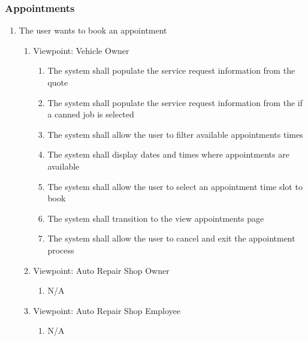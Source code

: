 \documentclass[12pt]{article}
\begin{document}
\subsubsection{Appointments}
\begin{enumerate}[resume*=business_events]
	\item The user wants to book an appointment
	      \begin{enumerate}[VP\arabic*.]
		      \item Viewpoint: Vehicle Owner
		            \begin{enumerate}
			            \item The system shall populate the service request information from the quote
			            \item The system shall populate the service request information from the if a canned job is selected
			            \item The system shall allow the user to filter available appointments times
			            \item The system shall display dates and times where appointments are available
			            \item The system shall allow the user to select an appointment time slot to book
			            \item The system shall transition to the view appointments page
			            \item The system shall allow the user to cancel and exit the appointment process
		            \end{enumerate}
		      \item Viewpoint: Auto Repair Shop Owner
		            \begin{enumerate}
			            \item[] N/A
		            \end{enumerate}
		      \item Viewpoint: Auto Repair Shop Employee
		            \begin{enumerate}
			            \item[] N/A
		            \end{enumerate}
	      \end{enumerate}


\end{enumerate}
\end{document}
